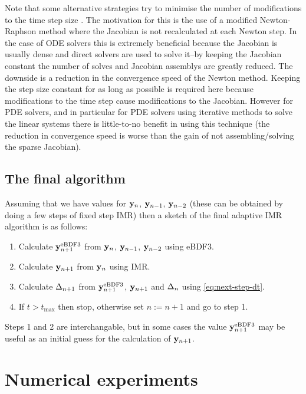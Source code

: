 Note that some alternative strategies try to minimise the number of modifications to the time step size \cite[chap. 6]{Iserles2009} \cite[Sec. 2.1]{cvode-manual}.
The motivation for this is the use of a modified Newton-Raphson method where the Jacobian is not recalculated at each Newton step.
In the case of ODE solvers this is extremely beneficial because the Jacobian is usually dense and direct solvers are used to solve it--by keeping the Jacobian constant the number of solves and Jacobian assemblys are greatly reduced.
The downside is a reduction in the convergence speed of the Newton method.
Keeping the step size constant for as long as possible is required here because modifications to the time step cause modifications to the Jacobian.
However for PDE solvers, and in particular for PDE solvers using iterative methods to solve the linear systems there is little-to-no benefit in using this technique (the reduction in convergence speed is worse than the gain of not assembling/solving the sparse Jacobian)\cite[pg. 128]{Iserles2009}.


\subsection{The final algorithm}

Assuming that we have values for $\mathbf{y}_n$, $\mathbf{y}_{n-1}$, $\mathbf{y}_{n-2}$ (these can be obtained \eg by doing a few steps of fixed step IMR) then a sketch of the final adaptive IMR algorithm is as follows:
\begin{enumerate}
\item Calculate $\mathbf{y}_{n+1}^{\text{eBDF3}}$ from $\mathbf{y}_n$, $\mathbf{y}_{n-1}$, $\mathbf{y}_{n-2}$ using eBDF3.
\item Calculate $\mathbf{y}_{n+1}$ from $\mathbf{y}_n$ using IMR.
\item Calculate $\Delta_{n+1}$ from $\mathbf{y}_{n+1}^{\text{eBDF3}}$, $\mathbf{y}_{n+1}$ and $\Delta_{n}$ using
  \eqref{eq:next-step-dt}.
\item If $t > t_{\text{max}}$ then stop, otherwise set $n := n+1$ and go to step 1.
\end{enumerate}

Steps 1 and 2 are interchangable, but in some cases the value $\mathbf{y}_{n+1}^{\text{eBDF3}}$ may be useful as an initial guess for the calculation of $\mathbf{y}_{n+1}$.


\section{Numerical experiments}
\label{sec:aimr-testing}


